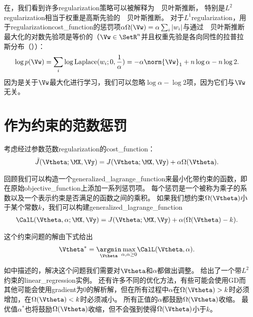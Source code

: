 在，我们看到许多\gls{regularization}策略可以被解释为~~贝叶斯推断，
特别是$L^2$\gls{regularization}相当于权重是高斯先验的~~贝叶斯推断。
对于$L^1$\gls{regularization}，用于\gls{regularization}\gls{cost_function}的惩罚项$\alpha \Omega(\Vw) =  \alpha \sum_i |w_i |$与通过~~贝叶斯推断最大化的对数先验项是等价的（$\Vw \in \SetR^n$并且权重先验是各向同性的拉普拉斯分布（））：
\begin{align}
\log p(\Vw) = \sum_i \log \text{Laplace}(w_i;0,\frac{1}{\alpha}) = 
  -\alpha \norm{\Vw}_1 + n \log \alpha - n \log 2.
\end{align}
因为是关于$\Vw$最大化进行学习，我们可以忽略$\log \alpha - \log 2$项，因为它们与$\Vw$无关。
 
 
 \section{作为约束的范数惩罚}
 \label{sec:7.2}
考虑经过参数范数\gls{regularization}的\gls{cost_function}：
\begin{align}
 \tilde{J}(\Vtheta;\MX, \Vy) = J(\Vtheta;\MX, \Vy) + \alpha \Omega(\Vtheta) .
\end{align}

回顾我们可以构造一个\gls{generalized_lagrange_function}来最小化带约束的函数，即在原始\gls{objective_function}上添加一系列惩罚项。
每个惩罚是一个被称为乘子的系数以及一个表示约束是否满足的函数之间的乘积。
如果我们想约束$\Omega(\Vtheta)$小于某个常数$k$，我们可以构建\gls{generalized_lagrange_function}
\begin{align}
 \CalL(\Vtheta, \alpha; \MX, \Vy) = J(\Vtheta; \MX, \Vy) + \alpha (\Omega(\Vtheta) - k).
\end{align}

这个约束问题的解由下式给出
\begin{align}
 \Vtheta^* = \underset{\Vtheta}{ \argmin} \underset{\alpha, \alpha \geq 0}{\max} \CalL(\Vtheta, \alpha).
\end{align}

如中描述的，解决这个问题我们需要对$\Vtheta$和$\alpha$都做出调整。
给出了一个带$L^2$约束的\gls{linear_regression}实例。
还有许多不同的优化方法，有些可能会使用\gls{GD}而其他可能会使用\gls{gradient}为0的解析解，但在所有过程中$\alpha$在$\Omega(\Vtheta) > k$时必须增加，在$\Omega(\Vtheta) < k$时必须减小。
所有正值的$\alpha$都鼓励$\Omega(\Vtheta)$收缩。
最优值$\alpha^*$也将鼓励$\Omega(\Vtheta)$收缩，但不会强到使得$\Omega(\Vtheta)$小于$k$。


